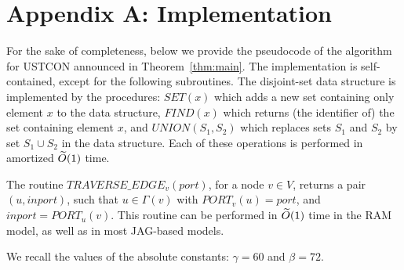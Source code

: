 \documentclass[11pt,a4paper]{article}
\renewcommand{\O}{\ensuremath \widetilde O}
\renewcommand{\*}{\hspace*{5mm}}
\begin{document}
\newpage
\section*{Appendix A: Implementation}

For the sake of completeness, below we provide the pseudocode of the algorithm for USTCON announced in Theorem~\ref{thm:main}. The implementation is self-contained, except for the following subroutines. The disjoint-set data structure is implemented by the procedures: $SET(x)$ which adds a new set containing only element $x$ to the data structure, $FIND(x)$ which returns (the identifier of) the set containing element $x$, and $UNION(S_1, S_2)$ which replaces sets $S_1$ and $S_2$ by set $S_1\cup S_2$ in the data structure. Each of these operations is performed in amortized $\O(1)$ time.

The routine $TRAVERSE\_EDGE_v(port)$, for a node $v\in V$, returns a pair $(u, inport)$, such that $u \in \Gamma(v)$ with $PORT_v(u) = port$, and $inport = PORT_u(v)$. This routine can be performed in $\O(1)$ time in the RAM model, as well as in most JAG-based models.

We recall the values of the absolute constants: $\gamma = 60$ and $\beta = 72$.
\end{document}
